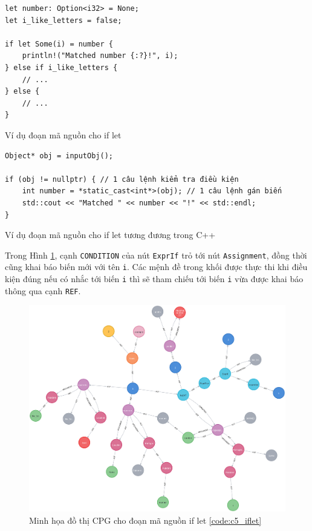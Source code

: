 \begin{listing}[H]
\begin{verbatim}
let number: Option<i32> = None;
let i_like_letters = false;

if let Some(i) = number {
    println!("Matched number {:?}!", i);
} else if i_like_letters {
    // ...
} else {
    // ...
}
\end{verbatim}
\caption{Ví dụ đoạn mã nguồn cho if let}
\label{code:c5_iflet}
\end{listing}

\begin{listing}[H]
\begin{verbatim}
Object* obj = inputObj();

if (obj != nullptr) { // 1 câu lệnh kiểm tra điều kiện
    int number = *static_cast<int*>(obj); // 1 câu lệnh gán biến
    std::cout << "Matched " << number << "!" << std::endl;
}
\end{verbatim}
\caption{Ví dụ đoạn mã nguồn cho if let tương đương trong C++}
\label{code:c5_iflet_cpp}
\end{listing}

Trong Hình \ref{img:c5_cpg_iflet}, cạnh \texttt{CONDITION} của nút \texttt{ExprIf} trỏ tới nút \texttt{Assignment}, đồng thời cũng khai báo biến mới với tên \texttt{i}.
Các mệnh đề trong khối được thực thi khi điều kiện đúng nếu có nhắc tới biến \texttt{i} thì sẽ tham chiếu tới biến \texttt{i} vừa được khai báo thông qua cạnh \texttt{REF}.

\begin{figure}[H]
\includegraphics[width=1\columnwidth]{figures/c5/c5_iflet.png}
\centering
\caption{Minh họa đồ thị CPG cho đoạn mã nguồn if let \ref{code:c5_iflet}}
\label{img:c5_cpg_iflet}
\end{figure}

